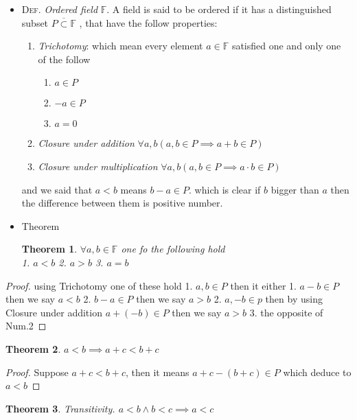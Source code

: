 \documentclass[11pt, a4paper]{article}
\newtheorem{theorem}{Theorem}
\begin{document}
\begin{itemize}
\item \textsc{Def}. \emph{Ordered field} \(\mathbb{F}\). A field is said to be ordered if it has a distinguished subset
\(\overline{P \subset \mathbb{F}}\) , that have the follow properties:
\begin{enumerate}
\item \emph{Trichotomy}: which mean every element \(a \in \mathbb{F}\) satisfied one and only one of the follow
\begin{enumerate}
\item \(a \in P\)
\item \(-a \in P\)
\item \(a = 0\)
\end{enumerate}
\item \emph{Closure under addition} \(\forall a,b ( a,b \in P \implies a + b \in P)\)
\item \emph{Closure under multiplication} \(\forall a, b ( a, b \in P \implies a \cdot b \in P)\)
\end{enumerate}
and we said that \(a < b\) means \(b - a \in P\). which is clear if \(b\) bigger than \(a\) then the difference
between them is positive number.

\item Theorem

\begin{theorem}
  $ \forall a, b \in \mathbb{F}$ one fo the following hold \\
1. $a<b$
2. $a>b$
3. $a=b$
\end{theorem}
\end{itemize}

\begin{proof}
    using Trichotomy one of these hold
  1. $a, b \in P$ then it either
     1. $a - b \in P$ then we say $a < b$
     2. $b - a \in P$ then we say $a > b$
  2. $a, -b \in p$ then by using Closure under addition $a + (-b) \in P$ then we say $a > b$
  3. the opposite of Num.2
\end{proof}

\begin{theorem}
  $a < b \implies a + c < b + c$
\end{theorem}

\begin{proof}
  Suppose $a + c < b + c$, then it means $a + c -( b + c) \in P$ which deduce to $a < b$
\end{proof}

\begin{theorem}
  \textit{Transitivity}. $a < b \land b < c \implies a < c$
\end{theorem}
\end{document}
